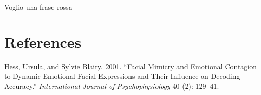 \documentclass[
]{article}
\newlength{\cslhangindent}
\newlength{\cslentryspacingunit} %
\newenvironment{CSLReferences}[2] %
 {%
  \setlength{\parindent}{0pt}
  \ifodd #1
  \let\oldpar\par
  \def\par{\hangindent=\cslhangindent\oldpar}
  \fi
  \setlength{\parskip}{#2\cslentryspacingunit}
 }%
 {}
\begin{document}
\color{red} Voglio una frase rossa \normalcolor

\newpage

\hypertarget{references}{%
\section*{References}\label{references}}

\hypertarget{refs}{}
\begin{CSLReferences}{1}{0}
\leavevmode{}%
Hess, Ursula, and Sylvie Blairy. 2001. {``Facial Mimicry and Emotional Contagion to Dynamic Emotional Facial Expressions and Their Influence on Decoding Accuracy.''} \emph{International Journal of Psychophysiology} 40 (2): 129--41.

\end{CSLReferences}
\end{document}
